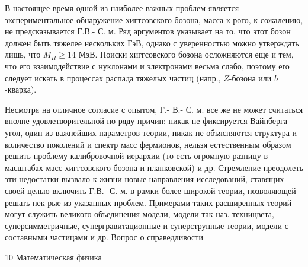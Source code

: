 \documentclass[10pt]{article}
\begin{document}
В настоящее время одной из наиболее важных проблем является экспериментальное обнаружение хигтсовского бозона, масса к-рого, к сожалению, не предсказывается Г.В.- С. м. Ряд аргументов указывает на то, что этот бозон должен быть тяжелее нескольких ГэВ, однако с уверенностью можно утверждать лишь, что $M_{H} \geqslant 14$ МэВ. Поиски хиггсовского бозона осложняются еще и тем, что его взаимодействие с нуклонами и электронами весьма слабо, поэтому его следует искать в процессах распада тяжелых частиц (напр., $Z$-бозона или $b$-кварка).



Несмотря на отличное согласие с опытом, Г.- В.- С. м. все же не может считаться вполне удовлетворительной по ряду причин: никак не фиксируется Вайнберга угол, один из важнейших параметров теории, никак не объясняются структура и количество поколений и спектр масс фермионов, нельзя естественным образом решить проблему калибровочной иерархии (то есть огромную разницу в масштабах масс хиггсовского бозона и планковской) и др. Стремление преодолеть эти недостатки вызвало к жизни новые направления исследований, ставящих своей целью включить Г.В.- С. м. в рамки более широкой теории, позволяющей решать нек-рые из указанных проблем. Примерами таких расширенных теорий могут служить великого объединения модели, модели так наз. техницвета, суперсимметричные, супергравитационные и суперструнные теории, модели с составными частицами и др. Вопрос о справедливости



10 Математическая физика
\end{document}
